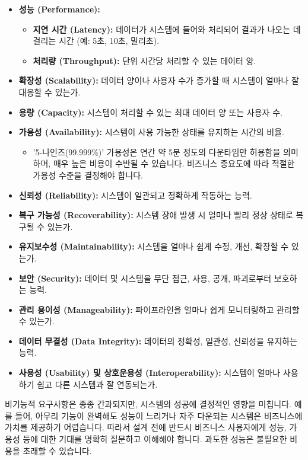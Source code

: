 \documentclass[11pt,a4paper]{article}
\begin{document}
\begin{itemize}
    \item \textbf{성능 (Performance):}
    \begin{itemize}
        \item \textbf{지연 시간 (Latency):} 데이터가 시스템에 들어와 처리되어 결과가 나오는 데 걸리는 시간 (예: 5초, 10초, 밀리초).
        \item \textbf{처리량 (Throughput):} 단위 시간당 처리할 수 있는 데이터 양.
    \end{itemize}
    \item \textbf{확장성 (Scalability):} 데이터 양이나 사용자 수가 증가할 때 시스템이 얼마나 잘 대응할 수 있는가.
    \item \textbf{용량 (Capacity):} 시스템이 처리할 수 있는 최대 데이터 양 또는 사용자 수.
    \item \textbf{가용성 (Availability):} 시스템이 사용 가능한 상태를 유지하는 시간의 비율.
    \begin{itemize}
        \item '5-나인즈(99.999\%)' 가용성은 연간 약 5분 정도의 다운타임만 허용함을 의미하며, 매우 높은 비용이 수반될 수 있습니다. 비즈니스 중요도에 따라 적절한 가용성 수준을 결정해야 합니다.
    \end{itemize}
    \item \textbf{신뢰성 (Reliability):} 시스템이 일관되고 정확하게 작동하는 능력.
    \item \textbf{복구 가능성 (Recoverability):} 시스템 장애 발생 시 얼마나 빨리 정상 상태로 복구될 수 있는가.
    \item \textbf{유지보수성 (Maintainability):} 시스템을 얼마나 쉽게 수정, 개선, 확장할 수 있는가.
    \item \textbf{보안 (Security):} 데이터 및 시스템을 무단 접근, 사용, 공개, 파괴로부터 보호하는 능력.
    \item \textbf{관리 용이성 (Manageability):} 파이프라인을 얼마나 쉽게 모니터링하고 관리할 수 있는가.
    \item \textbf{데이터 무결성 (Data Integrity):} 데이터의 정확성, 일관성, 신뢰성을 유지하는 능력.
    \item \textbf{사용성 (Usability) 및 상호운용성 (Interoperability):} 시스템이 얼마나 사용하기 쉽고 다른 시스템과 잘 연동되는가.
\end{itemize}

\begin{warningbox}
비기능적 요구사항은 종종 간과되지만, 시스템의 성공에 결정적인 영향을 미칩니다. 예를 들어, 아무리 기능이 완벽해도 성능이 느리거나 자주 다운되는 시스템은 비즈니스에 가치를 제공하기 어렵습니다. 따라서 설계 전에 반드시 비즈니스 사용자에게 성능, 가용성 등에 대한 기대를 명확히 질문하고 이해해야 합니다. 과도한 성능은 불필요한 비용을 초래할 수 있습니다.
\end{warningbox}
\end{document}
